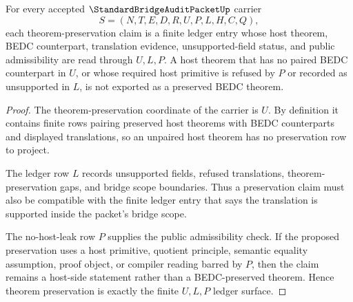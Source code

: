 \begin{theorem}
\label{thm:standard-bridge-audit-packet-theorem-preservation-ledger}
For every accepted $\StandardBridgeAuditPacketUp$ carrier
$$
S=(N,T,E,D,R,U,P,L,H,C,Q),
$$
each theorem-preservation claim is a finite ledger entry whose host theorem, BEDC counterpart, translation evidence, unsupported-field status, and public admissibility are read through $U,L,P$. A host theorem that has no paired BEDC counterpart in $U$, or whose required host primitive is refused by $P$ or recorded as unsupported in $L$, is not exported as a preserved BEDC theorem.
\end{theorem}
\begin{proof}
The theorem-preservation coordinate of the carrier is $U$. By definition it contains finite rows pairing preserved host theorems with BEDC counterparts and displayed translations, so an unpaired host theorem has no preservation row to project.

The ledger row $L$ records unsupported fields, refused translations, theorem-preservation gaps, and bridge scope boundaries. Thus a preservation claim must also be compatible with the finite ledger entry that says the translation is supported inside the packet's bridge scope.

The no-host-leak row $P$ supplies the public admissibility check. If the proposed preservation uses a host primitive, quotient principle, semantic equality assumption, proof object, or compiler reading barred by $P$, then the claim remains a host-side statement rather than a BEDC-preserved theorem. Hence theorem preservation is exactly the finite $U,L,P$ ledger surface.
\end{proof}

